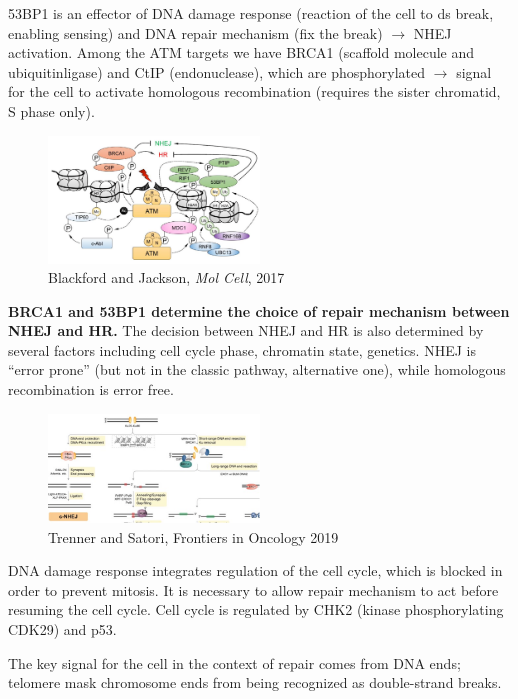 53BP1 is an effector of DNA damage response (reaction of the cell to ds break, enabling sensing) and DNA repair mechanism (fix the break) $\rightarrow$ NHEJ activation. Among the ATM targets we have BRCA1 (scaffold molecule and ubiquitinligase) and CtIP (endonuclease), which are phosphorylated $\rightarrow$ signal for the cell to activate homologous recombination (requires the sister chromatid, S phase only).

\begin{figure}
\centering
\includegraphics[width=0.5\textwidth]{../_resources/Screen_Shot_2022-11-30_at_09-16-55.png}
\caption{Blackford and Jackson, \emph{Mol Cell}, 2017}
\end{figure}

\textbf{BRCA1 and 53BP1 determine the choice of repair mechanism between NHEJ
and HR.} The decision between NHEJ and HR is also determined by several factors including cell cycle phase, chromatin state, genetics. NHEJ is ``error prone'' (but not in the classic pathway, alternative one), while homologous recombination is error free.

\begin{figure}
\centering
\includegraphics[width=0.5\textwidth]{../_resources/Picture1.jpg}
\caption{Trenner and Satori, Frontiers in Oncology 2019}
\end{figure}


DNA damage response integrates regulation of the cell cycle, which is blocked in order to prevent mitosis. It is necessary to allow repair mechanism to act before resuming the cell cycle. Cell cycle is regulated by CHK2 (kinase phosphorylating CDK29) and p53.

The key signal for the cell in the context of repair comes from DNA ends; telomere mask chromosome ends from being recognized as double-strand breaks.

